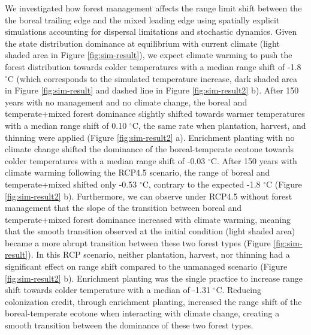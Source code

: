 \documentclass[12pt]{article}
\begin{document}
We investigated how forest management affects the range limit shift
between the the boreal trailing edge and the mixed leading edge using
spatially explicit simulations accounting for dispersal limitations and
stochastic dynamics. Given the state distribution dominance at
equilibrium with current climate (light shaded area in Figure
\ref{fig:sim-result}), we expect climate warming to push the forest
distribution towards colder temperatures with a median range shift of
-1.8 \(^{\circ}\)C (which corresponds to the simulated temperature
increase, dark shaded area in Figure \ref{fig:sim-result} and dashed
line in Figure \ref{fig:sim-result2} b). After 150 years with no
management and no climate change, the boreal and temperate+mixed forest
dominance slightly shifted towards warmer temperatures with a median
range shift of 0.10 \(^{\circ}\)C, the same rate when plantation,
harvest, and thinning were applied (Figure \ref{fig:sim-result2} a).
Enrichment planting with no climate change shifted the dominance of the
boreal-temperate ecotone towards colder temperatures with a median range
shift of -0.03 \(^{\circ}\)C. After 150 years with climate warming
following the RCP4.5 scenario, the range of boreal and temperate+mixed
shifted only -0.53 \(^{\circ}\)C, contrary to the expected -1.8
\(^{\circ}\)C (Figure \ref{fig:sim-result2} b). Furthermore, we can
observe under RCP4.5 without forest management that the slope of the
transition between boreal and temperate+mixed forest dominance increased
with climate warming, meaning that the smooth transition observed at the
initial condition (light shaded area) became a more abrupt transition
between these two forest types (Figure \ref{fig:sim-result}). In this
RCP scenario, neither plantation, harvest, nor thinning had a
significant effect on range shift compared to the unmanaged scenario
(Figure \ref{fig:sim-result2} b). Enrichment planting was the single
practice to increase range shift towards colder temperature with a
median of -1.31 \(^{\circ}\)C. Reducing colonization credit, through
enrichment planting, increased the range shift of the boreal-temperate
ecotone when interacting with climate change, creating a smooth
transition between the dominance of these two forest types.
\end{document}
